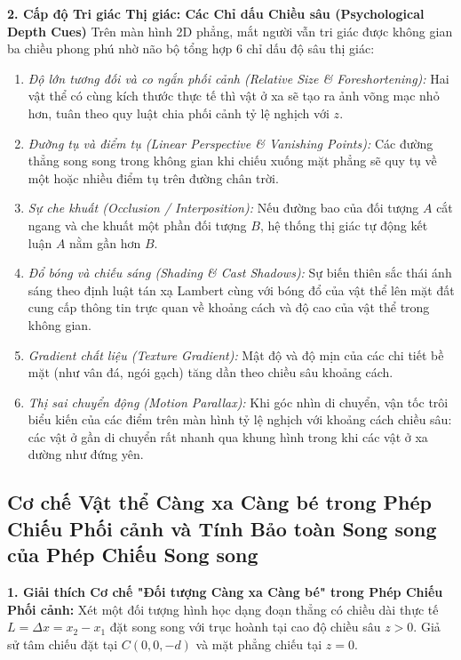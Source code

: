 \textbf{2. Cấp độ Tri giác Thị giác: Các Chỉ dấu Chiều sâu (Psychological Depth Cues)}
Trên màn hình 2D phẳng, mắt người vẫn tri giác được không gian ba chiều phong phú nhờ não bộ tổng hợp 6 chỉ dấu độ sâu thị giác:
\begin{enumerate}
    \item \textit{Độ lớn tương đối và co ngắn phối cảnh (Relative Size \& Foreshortening):} Hai vật thể có cùng kích thước thực tế thì vật ở xa sẽ tạo ra ảnh võng mạc nhỏ hơn, tuân theo quy luật chia phối cảnh tỷ lệ nghịch với $z$.
    \item \textit{Đường tụ và điểm tụ (Linear Perspective \& Vanishing Points):} Các đường thẳng song song trong không gian khi chiếu xuống mặt phẳng sẽ quy tụ về một hoặc nhiều điểm tụ trên đường chân trời.
    \item \textit{Sự che khuất (Occlusion / Interposition):} Nếu đường bao của đối tượng $A$ cắt ngang và che khuất một phần đối tượng $B$, hệ thống thị giác tự động kết luận $A$ nằm gần hơn $B$.
    \item \textit{Đổ bóng và chiếu sáng (Shading \& Cast Shadows):} Sự biến thiên sắc thái ánh sáng theo định luật tán xạ Lambert cùng với bóng đổ của vật thể lên mặt đất cung cấp thông tin trực quan về khoảng cách và độ cao của vật thể trong không gian.
    \item \textit{Gradient chất liệu (Texture Gradient):} Mật độ và độ mịn của các chi tiết bề mặt (như vân đá, ngói gạch) tăng dần theo chiều sâu khoảng cách.
    \item \textit{Thị sai chuyển động (Motion Parallax):} Khi góc nhìn di chuyển, vận tốc trôi biểu kiến của các điểm trên màn hình tỷ lệ nghịch với khoảng cách chiều sâu: các vật ở gần di chuyển rất nhanh qua khung hình trong khi các vật ở xa dường như đứng yên.
\end{enumerate}

\subsection{Cơ chế Vật thể Càng xa Càng bé trong Phép Chiếu Phối cảnh và Tính Bảo toàn Song song của Phép Chiếu Song song}
\label{subsec:perspective_shrinking_vs_parallel_invariance}

\textbf{1. Giải thích Cơ chế "Đối tượng Càng xa Càng bé" trong Phép Chiếu Phối cảnh:}
Xét một đối tượng hình học dạng đoạn thẳng có chiều dài thực tế $L = \Delta x = x_2 - x_1$ đặt song song với trục hoành tại cao độ chiều sâu $z > 0$. Giả sử tâm chiếu đặt tại $C(0, 0, -d)$ và mặt phẳng chiếu tại $z = 0$.


